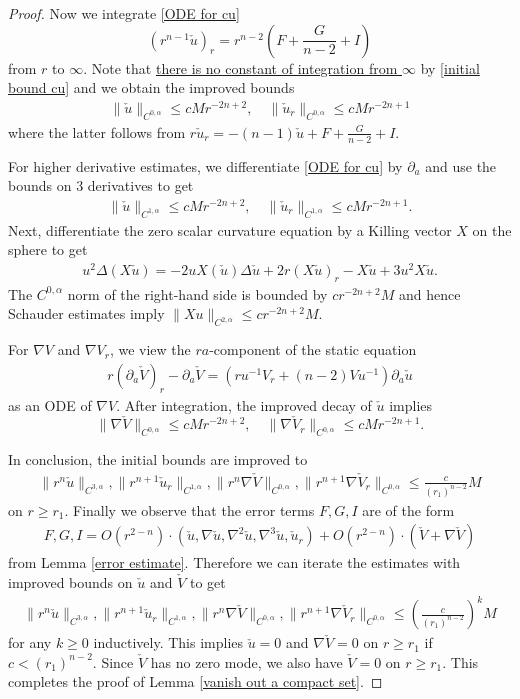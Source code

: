 \documentclass[12pt,twoside]{article}
\theoremstyle{plain}
\theoremstyle{definition}
\theoremstyle{remark}
\newcommand{\pl}{\partial}
\newcommand{\na}{\nabla}
\newcommand{\lt}{\left}
\newcommand{\rt}{\right}
\newcommand{\cu}{\check{u}}
\newcommand{\cV}{\check{V}}
\numberwithin{equation}{section}
\begin{document}
\begin{proof}
Now we integrate \eqref{ODE for cu} \[ ( r^{n-1} \cu )_r = r^{n-2}(F+\frac{G}{n-2}+I)\] from $r$ to $\infty$. Note that {\underline{there is no constant  of integration from $\infty$}} by \eqref{initial bound cu} and we obtain the improved bounds
\begin{align}\label{cu C0alpha}
\| \cu \|_{C^{0,\alpha}} \le c M r^{-2n+2}, \quad\| \cu_r\|_{C^{0,\alpha}} \le c M r^{-2n+1} 
\end{align}
where the latter follows from $r\cu_r = -(n-1) \cu + F+ \frac{G}{n-2}+I$.

For higher derivative estimates, we differentiate \eqref{ODE for cu} by $\pl_a$ and use the bounds on 3 derivatives to get
\begin{align*}
\| \cu\|_{C^{1,\alpha}} \le c Mr^{-2n+2}, \quad \| \cu_r\|_{C^{1,\alpha}} \le c Mr^{-2n+1}.
\end{align*}
Next, differentiate the zero scalar curvature equation by a Killing vector $X$ on the sphere to get
\begin{align*}
u^2 \Delta (X\cu) = - 2uX(\cu) \Delta\cu + 2r (X\cu)_r - X\cu + 3u^2 X\cu.
\end{align*}
The $C^{0,\alpha}$ norm of the right-hand side is bounded by $cr^{-2n+2} M$ and hence Schauder estimates imply $\| Xu\|_{C^{2,\alpha}} \le c r^{-2n+2} M$.

For $\na V$ and $\na V_r$, we view the $ra$-component of the static equation
\begin{align*}
r ( \pl_a \cV)_r - \pl_a \cV = \lt(  r u^{-1} V_r + (n-2) V u^{-1} \rt) \pl_a \cu
\end{align*}
as an ODE of $\na V$. After integration, the improved decay of $\cu$ implies
\[ \| \na \cV \|_{C^{0,\alpha}} \le c M r^{-2n+2}, \quad \| \na \cV_r \|_{C^{0,\alpha}} \le c M r^{-2n+1}. \]

In conclusion, the initial bounds are improved to
\begin{align*}
\| r^{n} \cu\|_{C^{3,\alpha}}, \| r^{n+1} \cu_r\|_{C^{1,\alpha}}, \| r^{n} \na\cV\|_{C^{0,\alpha}}, \| r^{n+1} \na\cV_r\|_{C^{0,\alpha}} \le \frac{c}{(r_1)^{n-2}} M
\end{align*}
on $r \ge r_1$. Finally we observe that the error terms $F,G,I$ are of the form 
\begin{align}\label{reason can iterate}
F,G,I = O(r^{2-n})\cdot \lt( \cu, \na\cu, \na^2\cu, \na^3\cu, \cu_r \rt) +  O(r^{2-n}) \cdot \lt( \cV + \na\cV \rt)
\end{align}
from Lemma \ref{error estimate}. Therefore we can iterate the estimates with improved bounds on $\cu$ and $\cV$ to get
\begin{align*}
\| r^{n} \cu\|_{C^{3,\alpha}}, \| r^{n+1} \cu_r\|_{C^{1,\alpha}}, \| r^{n} \na\cV\|_{C^{0,\alpha}}, \| r^{n+1} \na\cV_r\|_{C^{0,\alpha}} \le \lt( \frac{c}{(r_1)^{n-2}}\rt)^k M
\end{align*}
for any $k \ge 0$ inductively. This implies $\cu=0$ and $\na \cV=0$ on $r \ge r_1$ if $c < (r_1)^{n-2}$. Since $\cV$ has no zero mode, we also have $\cV=0$ on $r \ge r_1$. This completes the proof of Lemma \ref{vanish out a compact set}.
\end{proof} 
\end{document}
